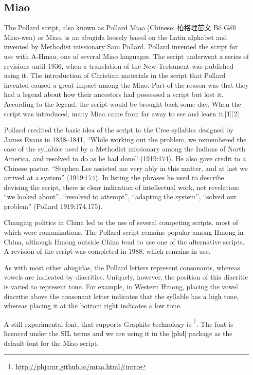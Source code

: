 \subsection{Miao}

The Pollard script, also known as Pollard Miao (Chinese: 柏格理苗文 Bó Gélǐ Miao-wen) or Miao, is an abugida loosely based on the Latin alphabet and invented by Methodist missionary Sam Pollard. Pollard invented the script for use with A-Hmao, one of several Miao languages. The script underwent a series of revisions until 1936, when a translation of the New Testament was published using it. The introduction of Christian materials in the script that Pollard invented caused a great impact among the Miao. Part of the reason was that they had a legend about how their ancestors had possessed a script but lost it. According to the legend, the script would be brought back some day. When the script was introduced, many Miao came from far away to see and learn it.[1][2]

Pollard credited the basic idea of the script to the Cree syllabics designed by James Evans in 1838–1841, “While working out the problem, we remembered the case of the syllabics used by a Methodist missionary among the Indians of North America, and resolved to do as he had done” (1919:174). He also gave credit to a Chinese pastor, “Stephen Lee assisted me very ably in this matter, and at last we arrived at a system” (1919:174). In listing the phrases he used to describe devising the script, there is clear indication of intellectual work, not revelation: “we looked about”, “resolved to attempt”, “adapting the system”, “solved our problem” (Pollard 1919:174,175).

Changing politics in China led to the use of several competing scripts, most of which were romanizations. The Pollard script remains popular among Hmong in China, although Hmong outside China tend to use one of the alternative scripts. A revision of the script was completed in 1988, which remains in use.

As with most other abugidas, the Pollard letters represent consonants, whereas vowels are indicated by diacritics. Uniquely, however, the position of this diacritic is varied to represent tone. For example, in Western Hmong, placing the vowel diacritic above the consonant letter indicates that the syllable has a high tone, whereas placing it at the bottom right indicates a low tone.

A still experimental font, that supports Graphite technology is \footnote{\url{http://phjamr.github.io/miao.html\#intro}}. The font is licenced under the SIL terms and we are using it in the |phd| package as the default font for the Miao script.

